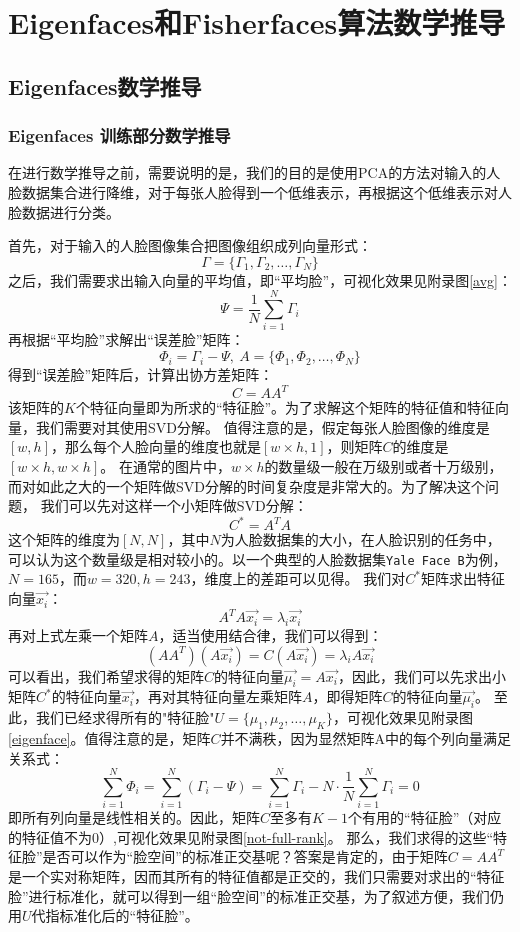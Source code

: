 \documentclass{ctexart}
\begin{document}
\section{Eigenfaces和Fisherfaces算法数学推导}
\subsection{Eigenfaces数学推导}
\subsubsection{Eigenfaces 训练部分数学推导}
在进行数学推导之前，需要说明的是，我们的目的是使用PCA的方法对输入的人脸数据集合进行降维，对于每张人脸得到一个低维表示，再根据这个低维表示对人脸数据进行分类。

\noindent
首先，对于输入的人脸图像集合把图像组织成列向量形式：
$$
    \Gamma = \{\Gamma_1, \Gamma_2, \dots ,\Gamma_N \}
$$
之后，我们需要求出输入向量的平均值，即“平均脸”，可视化效果见附录图\ref{avg}：
$$
    \Psi = \frac{1}{N}\sum_{i=1}^{N}\Gamma_i
$$
再根据“平均脸”求解出“误差脸”矩阵：
$$
    \Phi_i = \Gamma_i - \Psi,\ A = \{ \Phi_1, \Phi_2,\dots,\Phi_N \}
$$
得到“误差脸”矩阵后，计算出协方差矩阵：
$$
    C = AA^T
$$
该矩阵的$K$个特征向量即为所求的“特征脸”。为了求解这个矩阵的特征值和特征向量，我们需要对其使用SVD分解。
值得注意的是，假定每张人脸图像的维度是$[w,h]$，那么每个人脸向量的维度也就是$[w\times h,1]$，则矩阵$C$的维度是$[w\times h,w \times h]$。
在通常的图片中，$w \times h$的数量级一般在万级别或者十万级别，而对如此之大的一个矩阵做SVD分解的时间复杂度是非常大的。为了解决这个问题，
我们可以先对这样一个小矩阵做SVD分解：
$$
    C^* = A^TA
$$
这个矩阵的维度为$[N,N]$，其中$N$为人脸数据集的大小，在人脸识别的任务中，可以认为这个数量级是相对较小的。以一个典型的人脸数据集\texttt{Yale Face B}\cite{GeBeKr01}为例，$N=165$，而$w=320,h=243$，维度上的差距可以见得。
我们对$C^*$矩阵求出特征向量$\vec{x_i}$：
$$
    A^TA\vec{x_i} = \lambda_i \vec{x_i}
$$
再对上式左乘一个矩阵$A$，适当使用结合律，我们可以得到：
$$
    (AA^T)(A\vec{x_i}) = C(A\vec{x_i}) = \lambda_i A \vec{x_i}
$$
可以看出，我们希望求得的矩阵$C$的特征向量$\vec{\mu_i}=A\vec{x_i}$，因此，我们可以先求出小矩阵$C^*$的特征向量$\vec{x_i}$，再对其特征向量左乘矩阵$A$，即得矩阵$C$的特征向量$\vec{\mu_i}$。
至此，我们已经求得所有的"特征脸"$U=\{\mu_1, \mu_2,\dots,\mu_K \}$，可视化效果见附录图\ref{eigenface}。值得注意的是，矩阵$C$并不满秩，因为显然矩阵A中的每个列向量满足关系式：
$$
    \sum_{i=1}^N\Phi_i = \sum_{i=1}^N(\Gamma_i-\Psi)=\sum_{i=1}^N\Gamma_i-N\cdot \frac{1}{N}\sum_{i=1}^N\Gamma_i=0
$$
即所有列向量是线性相关的。因此，矩阵$C$至多有$K-1$个有用的“特征脸”（对应的特征值不为0）,可视化效果见附录图\ref{not-full-rank}。
那么，我们求得的这些“特征脸”是否可以作为“脸空间”的标准正交基呢？答案是肯定的，由于矩阵$C=AA^T$是一个实对称矩阵，因而其所有的特征值都是正交的，我们只需要对求出的“特征脸”进行标准化，就可以得到一组“脸空间”的标准正交基，为了叙述方便，我们仍用$U$代指标准化后的“特征脸”。
\end{document}
